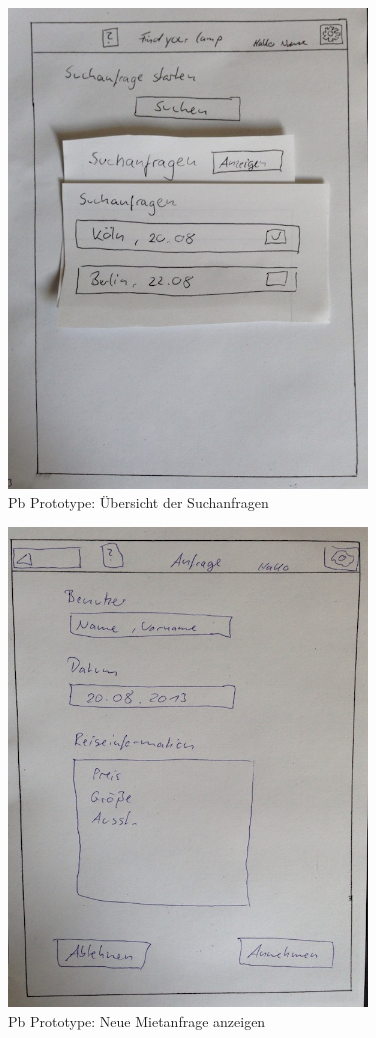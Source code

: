 \begin{figure}[H]
\centering
\includegraphics[angle=90, width=0.85\textwidth]{./images/paperbased/anfrage.JPG}
\caption{Pb Prototype: Übersicht der Suchanfragen}
\label{pbprototype1}
\end{figure}

\begin{figure}[H]
\centering
\includegraphics[angle=90, width=0.85\textwidth]{./images/paperbased/anfrageAnzeigen.JPG}
\caption{Pb Prototype: Neue Mietanfrage anzeigen}
\label{pbprototype2}
\end{figure}

